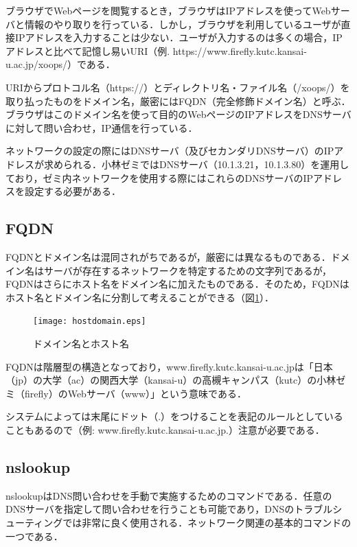ブラウザでWebページを閲覧するとき，ブラウザはIPアドレスを使ってWebサーバと情報のやり取りを行っている．しかし，ブラウザを利用しているユーザが直接IPアドレスを入力することは少ない．ユーザが入力するのは多くの場合，IPアドレスと比べて記憶し易いURI（例. https://www.firefly.kutc.kansai-u.ac.jp/xoops/）である．

URIからプロトコル名（https://）とディレクトリ名・ファイル名（/xoops/）を取り払ったものをドメイン名，厳密にはFQDN（完全修飾ドメイン名）と呼ぶ．ブラウザはこのドメイン名を使って目的のWebページのIPアドレスをDNSサーバに対して問い合わせ，IP通信を行っている．

ネットワークの設定の際にはDNSサーバ（及びセカンダリDNSサーバ）のIPアドレスが求められる．小林ゼミではDNSサーバ（10.1.3.21，10.1.3.80）を運用しており，ゼミ内ネットワークを使用する際にはこれらのDNSサーバのIPアドレスを設定する必要がある．

\subsection{FQDN}
FQDNとドメイン名は混同されがちであるが，厳密には異なるものである．ドメイン名はサーバが存在するネットワークを特定するための文字列であるが，FQDNはさらにホスト名をドメイン名に加えたものである．そのため，FQDNはホスト名とドメイン名に分割して考えることができる（図\ref{fig:URI_hostdomain}）．

\begin{figure}[htb]
  \begin{center}
    \texttt{[image: hostdomain.eps]}　
  \end{center}
  \caption{ドメイン名とホスト名}
  \label{fig:URI_hostdomain}
\end{figure}

FQDNは階層型の構造となっており，www.firefly.kutc.kansai-u.ac.jpは「日本（jp）の大学（ac）の関西大学（kansai-u）の高槻キャンパス（kutc）の小林ゼミ（firefly）のWebサーバ（www）」という意味である．

システムによっては末尾にドット（.）をつけることを表記のルールとしていることもあるので（例: www.firefly.kutc.kansai-u.ac.jp.）注意が必要である．

\subsection{nslookup}
nslookupはDNS問い合わせを手動で実施するためのコマンドである．任意のDNSサーバを指定して問い合わせを行うことも可能であり，DNSのトラブルシューティングでは非常に良く使用される．ネットワーク関連の基本的コマンドの一つである．\\

